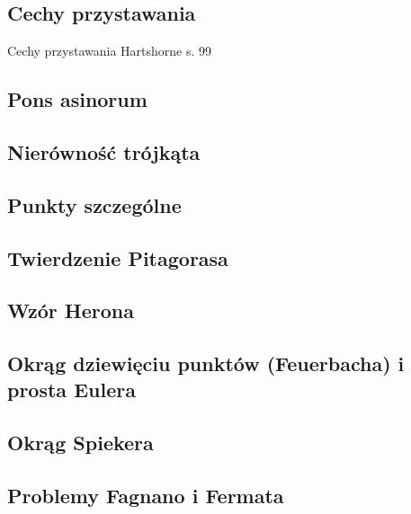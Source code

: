 

\subsection{Cechy przystawania}
Cechy przystawania
\loremipsum
Hartshorne s. 99

\subsection{Pons asinorum}


\subsection{Nierówność trójkąta}


\subsection{Punkty szczególne}


\subsection{Twierdzenie Pitagorasa}


\subsection{Wzór Herona}


\subsection{Okrąg dziewięciu punktów (Feuerbacha) i prosta Eulera}


\subsection{Okrąg Spiekera}


\subsection{Problemy Fagnano i Fermata}

